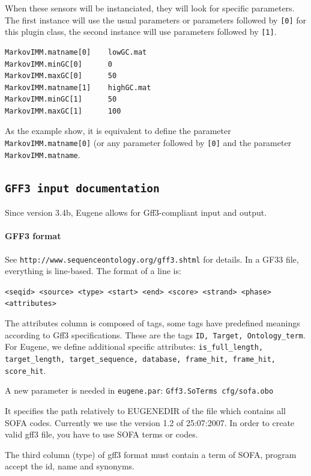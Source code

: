 \documentclass[a4paper,titlepage]{report}
\begin{document}
When these sensors will be instanciated, they will look for specific
parameters. The first instance will use the usual parameters or
parameters followed by \texttt{[0]} for this plugin class, the second
instance will use parameters followed by \texttt{[1]}.

\begin{Verbatim}
MarkovIMM.matname[0]    lowGC.mat 
MarkovIMM.minGC[0]      0
MarkovIMM.maxGC[0]      50
MarkovIMM.matname[1]    highGC.mat
MarkovIMM.minGC[1]      50
MarkovIMM.maxGC[1]      100
\end{Verbatim}

As the example show, it is equivalent to define the parameter
\texttt{MarkovIMM.matname[0]} (or any parameter followed by
\texttt{[0]} and the parameter \texttt{MarkovIMM.matname}.

\subsection{\texttt{GFF3 input documentation}} 

Since version 3.4b, Eugene allows for Gff3-compliant input and output.

\paragraph{GFF3 format}

See \texttt{http://www.sequenceontology.org/gff3.shtml} for details.
In a GF33 file, everything is line-based. The format of a line is:

\verb!<seqid> <source> <type> <start> <end> <score> <strand> <phase><attributes>!

The attributes column is composed of tags, some tags have predefined
meanings according to Gff3 specifications. These are the tags
\texttt{ID, Target, Ontology\_term}.  For Eugene, we define additional
specific attributes: \texttt{is\_full\_length, target\_length,
  target\_sequence, database, frame\_hit, frame\_hit, score\_hit}.

A new parameter is needed in \texttt{eugene.par}: 
\texttt{Gff3.SoTerms		cfg/sofa.obo}

It specifies the path relatively to EUGENEDIR of the file which contains
all SOFA codes. Currently we use the version 1.2 of 25:07:2007. In order
to create valid gff3 file, you have to use SOFA terms or codes.

The third column (type) of gff3 format must contain a term of SOFA,
program accept the id, name and synonyms.
\end{document}
